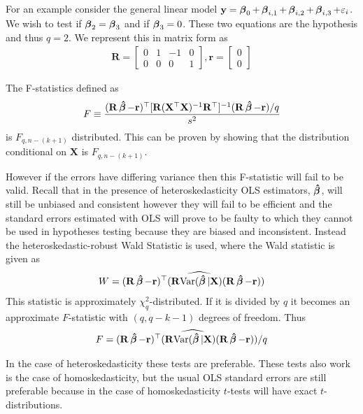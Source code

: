 For an example consider the general linear model $\mathbf{y} = \operatorname{\boldsymbol{\beta}}_0 + \operatorname{\boldsymbol{\beta}}_{i,1} + \operatorname{\boldsymbol{\beta}}_{i,2} + \operatorname{\boldsymbol{\beta}}_{i,3} + \varepsilon_i$. We wish to test if $\operatorname{\boldsymbol{\beta}}_2 = \operatorname{\boldsymbol{\beta}}_3$ and if $\operatorname{\boldsymbol{\beta}}_3 = 0$. These two equations are the hypothesis and thus $q = 2$. We represent this in matrix form as
\begin{align*}
    \mathbf{R} = \begin{bmatrix}0 & 1 & -1 & 0\\
    0 & 0 & 0 & 1\end{bmatrix}, \mathbf{r} = \begin{bmatrix}0\\0\end{bmatrix}
\end{align*}

The F-statistics defined as
\begin{align*}
    F &\equiv \dfrac{(\mathbf{R}\operatorname{\boldsymbol{\hat{\beta}}} - \mathbf{r})^\top  [\mathbf{R}(\mathbf{X}^\top \mathbf{X})^{-1}\mathbf{R}^\top]^{-1}  (\mathbf{R}\operatorname{\boldsymbol{\hat{\beta}}}- \mathbf{r}) / q}{s^2}\\
\end{align*}
is $F_{q, n - (k+1)}$ distributed. This can be proven by showing that the distribution conditional on $\mathbf{X}$ is $F_{q, n - (k+1)}$. 

However if the errors have differing variance then this F-statistic will fail to be valid.  Recall that in the presence of heteroskedasticity OLS estimators, $\operatorname{\boldsymbol{\hat{\beta}}}$, will still be unbiased and consistent however they will fail to be efficient and the standard errors estimated with OLS will prove to be faulty to which they cannot be used in hypotheses testing because they are biased and inconsistent. 
Instead the heteroskedastic-robust Wald Statistic is used, where the Wald statistic is given as
\begin{align*}
    W = (\mathbf{R}\operatorname{\boldsymbol{\hat{\beta}}} - \mathbf{r})^\top (\mathbf{R} \widehat{\operatorname{\text{Var}}(\operatorname{\boldsymbol{\hat{\beta}}}|\mathbf{X}})(\mathbf{R}\operatorname{\boldsymbol{\hat{\beta}}} - \mathbf{r}))
\end{align*}
This statistic is approximately $\chi^2_q$-distributed. If it is divided by $q$ it becomes an approximate $F$-statistic with $(q,q-k-1)$ degrees of freedom. Thus
\begin{align*}
    F = (\mathbf{R}\operatorname{\boldsymbol{\hat{\beta}}} - \mathbf{r})^\top (\mathbf{R} \widehat{\operatorname{\text{Var}}(\operatorname{\boldsymbol{\hat{\beta}}}|\mathbf{X}})(\mathbf{R}\operatorname{\boldsymbol{\hat{\beta}}} - \mathbf{r}))/q
\end{align*}

In the case of heteroskedasticity these tests are preferable. These tests also work is the case of homoskedasticity, but the usual OLS standard errors are still preferable because in the case of homoskedasticity $t$-tests will have exact $t$-distributions. 


